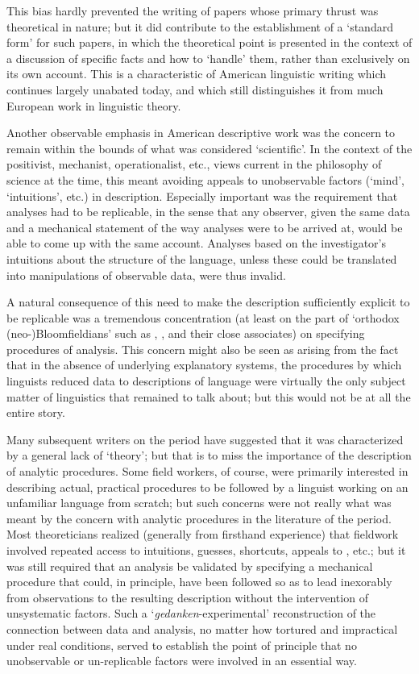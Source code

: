 This bias hardly prevented the writing of papers whose primary thrust
was theoretical in nature; but it did contribute to the establishment
of a `standard form' for such papers, in which the theoretical point
is presented in the context of a discussion of specific facts and how
to `handle' them, rather than exclusively on its own account. This is
a characteristic of American linguistic writing which continues
largely unabated today, and which still distinguishes it from much
European work in linguistic theory.

Another observable emphasis in American descriptive work was the
concern to remain within the bounds of what was considered
`scientific'. In the context of the positivist, mechanist,
operationalist, etc., views current in the philosophy of science at
the time, this meant avoiding appeals to unobservable factors (`mind',
`intuitions', etc.) in description. Especially important was the
requirement that analyses had to be replicable, in the sense that any
observer, given the same data and a mechanical statement of the way
analyses were to be arrived at, would be able to come up with the same
account. Analyses based on the investigator's intuitions about the
structure of the language, unless these could be translated into
manipulations of observable data, were thus invalid.

A natural consequence of this need to make the description
sufficiently explicit to be replicable was a tremendous concentration
(at least on the part of `orthodox (neo-)Bloomfieldians' such as
{\Bloch}, {\Harris}, and their close associates) on specifying procedures of
analysis. This concern might also be seen as arising from the fact
that in the absence of underlying explanatory systems, the procedures
by which linguists reduced data to descriptions of language were
virtually the only subject matter of linguistics that remained to talk
about; but this would not be at all the entire story.

Many subsequent writers on the period have suggested that it was
characterized by a general lack of `theory'; but that is to miss the
importance of the description of analytic procedures. Some field
workers, of course, were primarily interested in describing actual,
practical procedures to be followed by a linguist working on an
unfamiliar language from scratch; but such concerns were not really
what was meant by the concern with analytic procedures in the
literature of the period. Most theoreticians realized (generally from
firsthand experience) that fieldwork involved repeated access to
intuitions, guesses, shortcuts, appeals to , etc.; but it was
still required that an analysis be validated by specifying a
mechanical procedure that could, in principle, have been followed so
as to lead inexorably from observations to the resulting description
without the intervention of unsystematic factors. Such a
`\emph{gedanken}-experimental' reconstruction of the connection
between data and analysis, no matter how tortured and impractical
under real conditions, served to establish the point of principle that
no unobservable or un-replicable factors were involved in an essential
way.

